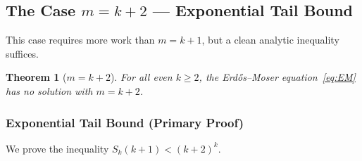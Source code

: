 \documentclass[12pt,a4paper]{article}
\theoremstyle{plain}
\newtheorem{theorem}{Theorem}[section]
\theoremstyle{definition}
\begin{document}
\subsection{The Case $m = k+2$ --- Exponential Tail Bound}
\label{sec:even-k2}

This case requires more work than $m = k+1$, but a clean analytic
inequality suffices.

\begin{theorem}[$m = k+2$]\label{thm:even-k2}
  For all even $k \ge 2$, the Erd\H{o}s--Moser equation~\eqref{eq:EM} has no
  solution with $m = k+2$.
\end{theorem}

\subsubsection{Exponential Tail Bound (Primary Proof)}
\label{sec:tmi-primary}

We prove the inequality $S_k(k+1) < (k+2)^k$.
\end{document}
